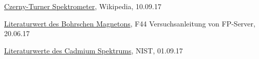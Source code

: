 \begin{thebibliography}{9}

  \href{https://de.wikipedia.org/wiki/Monochromator#/media/File:Czerny-turner.png}{Czerny-Turner Spektrometer},
  Wikipedia,
  10.09.17

  \href{http://www.physi.uni-heidelberg.de/Einrichtungen/FP/anleitungen/F44.pdf}{Literaturwert des Bohrschen Magnetons},
  F44 Versuchsanleitung von FP-Server,
  20.06.17

  \href{https://physics.nist.gov/PhysRefData/Handbook/Tables/cadmiumtable2.htm}{Literaturwerte des Cadmium Spektrums},
  NIST,
  01.09.17

\end{thebibliography}
